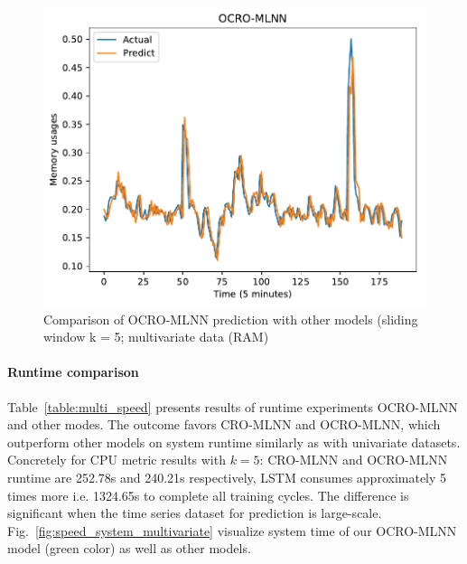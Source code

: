\documentclass[review,3p,authoryear]{elsarticle}
\begin{document}
{\begin{figure}[!ht]
\begin{minipage}[b]{0.33\linewidth}
    \includegraphics[width=0.9\linewidth]{images/pdf/predict/k5/ram_k5_ocro_mlnn.pdf} 
  \end{minipage} 
  
  \caption{Comparison of OCRO-MLNN prediction with other models (sliding window k = 5; multivariate data (RAM)} 
  \label{predict_ram_sliding5} 
\end{figure}


\paragraph{\textbf{Runtime comparison}} 
Table~\ref{table:multi_speed} presents results of runtime experiments OCRO-MLNN and other modes. The outcome favors CRO-MLNN and OCRO-MLNN, which outperform other models on system runtime similarly as with univariate datasets. Concretely for CPU metric results with $k = 5$: CRO-MLNN and OCRO-MLNN runtime are 252.78s and 240.21s respectively, LSTM consumes approximately 5 times more i.e. 1324.65s to complete all training cycles. The difference is significant when the time series dataset for prediction is large-scale. 
Fig.~\ref{fig:speed_system_multivariate} visualize system time of our OCRO-MLNN model (green color) as well as other models.



}
\end{document}
